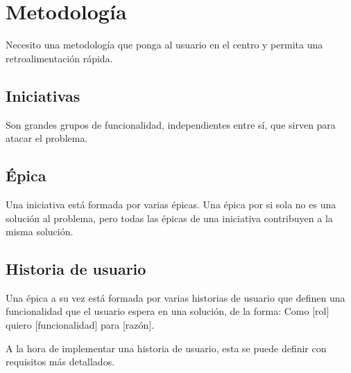 \chapter{Metodología}

Necesito una metodología que ponga al usuario en el centro y permita una retroalimentación rápida.

\section{Iniciativas}
Son grandes grupos de funcionalidad, independientes entre sí, que sirven para atacar el problema.

\section {Épica}
Una iniciativa está formada por varias épicas. Una épica por si sola no es una solución al problema, pero todas las épicas de una iniciativa contribuyen a la misma solución.

\section{Historia de usuario}
Una épica a su vez está formada por varias historias de usuario que definen una funcionalidad que el usuario espera en una solución, de la forma: Como [rol] quiero [funcionalidad] para [razón].

A la hora de implementar una historia de usuario, esta se puede definir con requisitos más detallados.



